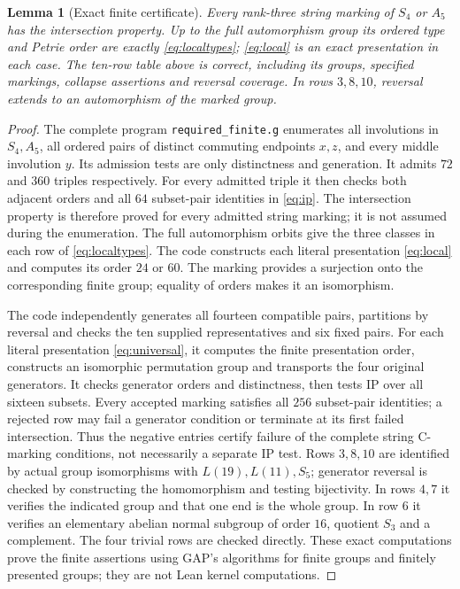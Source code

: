 \documentclass[11pt,a4paper]{article}
\newtheorem{lemma}[theorem]{Lemma}
\begin{document}
\begin{lemma}[Exact finite certificate]\label{lemma:finite}
Every rank-three string marking of $S_4$ or $A_5$ has the intersection
property. Up to the full automorphism group its ordered type and Petrie
order are exactly \eqref{eq:localtypes}; \eqref{eq:local} is an exact
presentation in each case. The ten-row table above is correct, including
its groups, specified markings, collapse assertions and reversal coverage.
In rows $3,8,10$, reversal extends to an automorphism of the marked group.
\end{lemma}
\begin{proof}
The complete program \texttt{required\_finite.g} enumerates all involutions
in $S_4,A_5$, all ordered pairs of distinct commuting endpoints $x,z$,
and every middle involution $y$. Its admission tests are only distinctness
and generation. It admits $72$ and $360$ triples respectively. For every
admitted triple it then checks both adjacent orders and all $64$
subset-pair identities in \eqref{eq:ip}. The intersection property is therefore proved for every admitted string
marking; it is not assumed during the enumeration. The full
automorphism orbits give the three classes in each row of
\eqref{eq:localtypes}. The code constructs each literal presentation
\eqref{eq:local} and computes its order $24$ or $60$. The marking
provides a surjection onto the corresponding finite group; equality of
orders makes it an isomorphism.

The code independently generates all fourteen compatible pairs, partitions
by reversal and checks the ten supplied representatives and six fixed
pairs. For each literal presentation \eqref{eq:universal}, it computes
the finite presentation order, constructs an isomorphic permutation group
and transports the four original generators. It checks generator orders and distinctness, then tests IP over all sixteen
subsets. Every accepted marking satisfies all $256$ subset-pair identities;
a rejected row may fail a generator condition or terminate at its first
failed intersection. Thus the negative entries certify failure of the
complete string C-marking conditions, not necessarily a separate IP test.
Rows $3,8,10$ are identified by actual group isomorphisms with
$L(19),L(11),S_5$; generator reversal is checked by constructing the
homomorphism and testing bijectivity. In rows $4,7$ it verifies the indicated group and that
one end is the whole group. In row $6$ it verifies an elementary abelian
normal subgroup of order $16$, quotient $S_3$ and a complement. The four
trivial rows are checked directly. These exact computations prove the
finite assertions using GAP's algorithms for finite groups and finitely
presented groups; they are not Lean kernel computations.
\end{proof}
\end{document}
